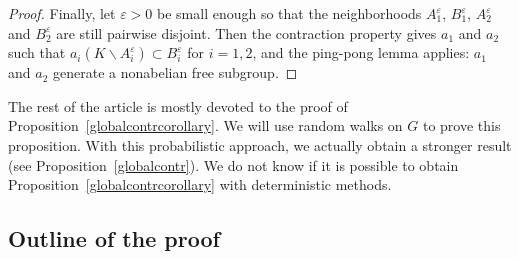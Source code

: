 \documentclass[AHL,Unicode,longabstracts,published]{cedram}
\newcommand{\ep}{\varepsilon}
\begin{document}
\begin{proof}
Finally, let $\ep>0$ be small enough so that the neighborhoods $A_1^\ep$, $B_1^\ep$, $A_2^\ep$ and $B_2^\ep$ are still pairwise disjoint. Then the contraction property gives $a_1$ and $a_2$ such that $a_i(K\backslash A_i^\ep)\subset B_i^\ep$ for $i=1,2$, and the {ping-pong lemma} applies: $a_1$ and $a_2$ generate a nonabelian free subgroup.
\end{proof}

The rest of the article is mostly devoted to the proof of Proposition~\ref{globalcontrcorollary}. We will use random walks on $G$ to prove this proposition. With this probabilistic approach, we actually obtain a stronger result (see Proposition~\ref{globalcontr}). We do not know if it is possible to obtain Proposition~\ref{globalcontrcorollary} with deterministic methods.



\subsection{Outline of the proof}
\end{document}
